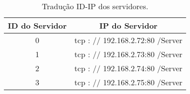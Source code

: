 \begin{description}
\begin{table}
\centering
\begin{tabular}{c|c}
ID do Servidor & IP do Servidor \\\hline
0 & tcp : // 192.168.2.72:80 /Server \\
1 & tcp : // 192.168.2.73:80 /Server \\
2 & tcp : // 192.168.2.74:80 /Server \\
3 & tcp : // 192.168.2.75:80 /Server \\
\end{tabular}
\caption{\label{tab:idip}Tradução ID-IP dos servidores.}
\end{table}
\end{description}